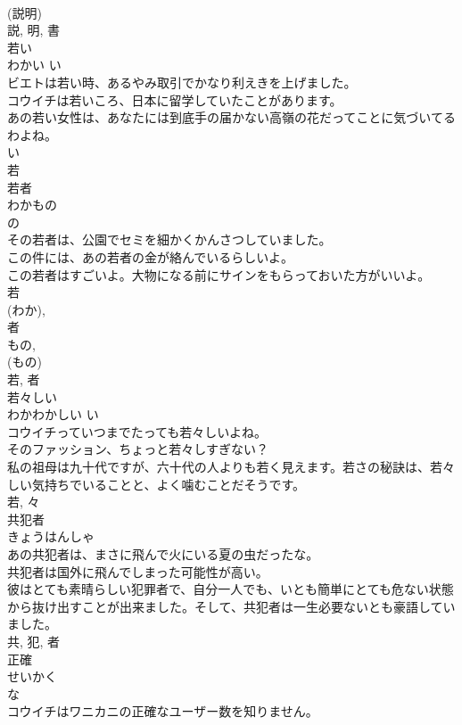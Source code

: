 \documentclass[8pt]{extreport}
\begin{document}
\begin{CJK}{UTF8}{min}
\\	(説明) 
\\	説, 明, 書	
\\	若い	
\\	わかい	い 
\\	ビエトは若い時、あるやみ取引でかなり利えきを上げました。	
\\	コウイチは若いころ、日本に留学していたことがあります。	
\\	あの若い女性は、あなたには到底手の届かない高嶺の花だってことに気づいてるわよね。	
\\	い 
\\	若	
\\	若者	
\\	わかもの	
\\	の 
\\	その若者は、公園でセミを細かくかんさつしていました。	
\\	この件には、あの若者の金が絡んでいるらしいよ。	
\\	この若者はすごいよ。大物になる前にサインをもらっておいた方がいいよ。	
\\	若 
\\	(わか), 
\\	者 
\\	もの, 
\\	(もの) 
\\	若, 者	
\\	若々しい	
\\	わかわかしい	い 
\\	コウイチっていつまでたっても若々しいよね。	
\\	そのファッション、ちょっと若々しすぎない？	
\\	私の祖母は九十代ですが、六十代の人よりも若く見えます。若さの秘訣は、若々しい気持ちでいることと、よく噛むことだそうです。	
\\	若, 々	
\\	共犯者	
\\	きょうはんしゃ	
\\	あの共犯者は、まさに飛んで火にいる夏の虫だったな。	
\\	共犯者は国外に飛んでしまった可能性が高い。	
\\	彼はとても素晴らしい犯罪者で、自分一人でも、いとも簡単にとても危ない状態から抜け出すことが出来ました。そして、共犯者は一生必要ないとも豪語していました。	
\\	共, 犯, 者	
\\	正確	
\\	せいかく	
\\	な 
\\	コウイチはワニカニの正確なユーザー数を知りません。	

\end{CJK}
\end{document}
